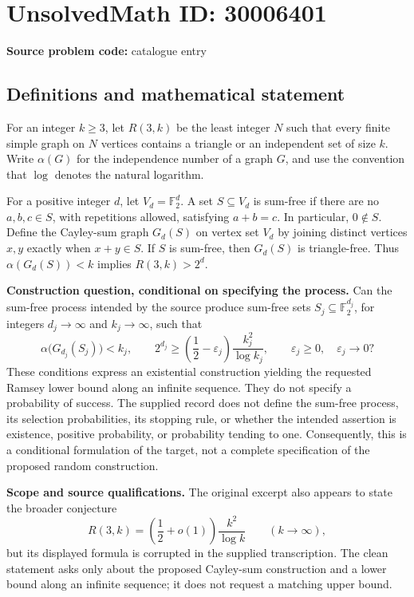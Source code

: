 \documentclass[11pt]{article}
\newcommand{\F}{\mathbb{F}}
\begin{document}
\section*{UnsolvedMath ID: 30006401}
\textbf{Source problem code:} catalogue entry
\subsection{Definitions and mathematical statement}
For an integer \(k\geq 3\), let \(R(3,k)\) be the least integer \(N\) such that every finite simple graph on \(N\) vertices contains a triangle or an independent set of size \(k\). Write \(\alpha(G)\) for the independence number of a graph \(G\), and use the convention that \(\log\) denotes the natural logarithm.

For a positive integer \(d\), let \(V_d=\F_2^d\). A set \(S\subseteq V_d\) is sum-free if there are no \(a,b,c\in S\), with repetitions allowed, satisfying \(a+b=c\). In particular, \(0\notin S\). Define the Cayley-sum graph \(G_d(S)\) on vertex set \(V_d\) by joining distinct vertices \(x,y\) exactly when \(x+y\in S\). If \(S\) is sum-free, then \(G_d(S)\) is triangle-free. Thus \(\alpha(G_d(S))<k\) implies \(R(3,k)>2^d\).

\textbf{Construction question, conditional on specifying the process.} Can the sum-free process intended by the source produce sum-free sets \(S_j\subseteq\F_2^{d_j}\), for integers \(d_j\to\infty\) and \(k_j\to\infty\), such that
\[
\alpha\bigl(G_{d_j}(S_j)\bigr)<k_j,
\qquad
2^{d_j}\geq\left(\frac12-\varepsilon_j\right)\frac{k_j^2}{\log k_j},
\qquad
\varepsilon_j\geq0,\quad \varepsilon_j\longrightarrow0?
\]
These conditions express an existential construction yielding the requested Ramsey lower bound along an infinite sequence. They do not specify a probability of success. The supplied record does not define the sum-free process, its selection probabilities, its stopping rule, or whether the intended assertion is existence, positive probability, or probability tending to one. Consequently, this is a conditional formulation of the target, not a complete specification of the proposed random construction.

\textbf{Scope and source qualifications.} The original excerpt also appears to state the broader conjecture
\[
R(3,k)=\left(\frac12+o(1)\right)\frac{k^2}{\log k}
\qquad (k\to\infty),
\]
but its displayed formula is corrupted in the supplied transcription. The clean statement asks only about the proposed Cayley-sum construction and a lower bound along an infinite sequence; it does not request a matching upper bound.
\end{document}
